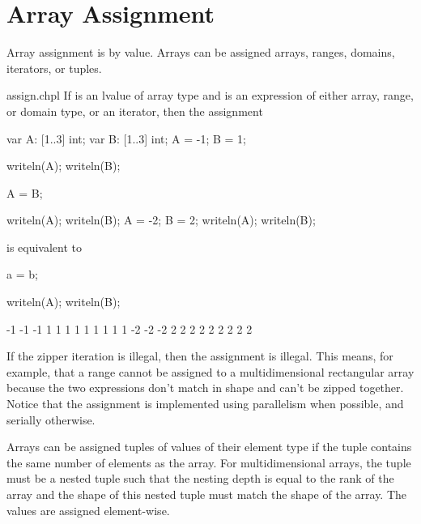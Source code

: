 \pagebreak
\section{Array Assignment}
\label{Array_Assignment}

Array assignment is by value.  Arrays can be assigned arrays, ranges,
domains, iterators, or tuples.

\begin{chapelexample}{assign.chpl}
If  is an lvalue of array type and  is an expression
of either array, range, or domain type, or an iterator, then the
assignment
\begin{chapelpre}
var A: [1..3] int;
var B: [1..3] int;
A = -1;
B = 1;
\end{chapelpre}
\begin{chapelnoprint}
writeln(A);
writeln(B);
\end{chapelnoprint}
\begin{chapel}
A = B;
\end{chapel}
\begin{chapelnoprint}
writeln(A);
writeln(B);
A = -2;
B = 2;
writeln(A);
writeln(B);
\end{chapelnoprint}
is equivalent to
\begin{chapel}
[(a,b) in zip(A,B)] a = b;
\end{chapel}
\begin{chapelpost}
writeln(A);
writeln(B);
\end{chapelpost}
\begin{chapeloutput}
-1 -1 -1
1 1 1
1 1 1
1 1 1
-2 -2 -2
2 2 2
2 2 2
2 2 2
\end{chapeloutput}
If the zipper iteration is illegal, then the assignment is illegal.
This means, for example, that a range cannot be assigned to a
multidimensional rectangular array because the two expressions don't
match in shape and can't be zipped together.  Notice that the
assignment is implemented using parallelism when possible, and
serially otherwise.
\end{chapelexample}

Arrays can be assigned tuples of values of their element type if the
tuple contains the same number of elements as the array.  For
multidimensional arrays, the tuple must be a nested tuple such that
the nesting depth is equal to the rank of the array and the shape of
this nested tuple must match the shape of the array.  The values are
assigned element-wise.

